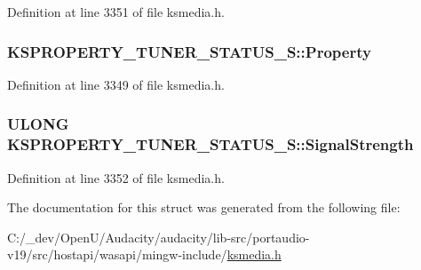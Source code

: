 Definition at line 3351 of file ksmedia.\+h.

\subsubsection[{\texorpdfstring{Property}{Property}}]{ K\+S\+P\+R\+O\+P\+E\+R\+T\+Y\+\_\+\+T\+U\+N\+E\+R\+\_\+\+S\+T\+A\+T\+U\+S\+\_\+\+S\+::\+Property}\hypertarget{struct_k_s_p_r_o_p_e_r_t_y___t_u_n_e_r___s_t_a_t_u_s___s_a1aa106b2f455577d29edec0fc9bc6b14}{}\label{struct_k_s_p_r_o_p_e_r_t_y___t_u_n_e_r___s_t_a_t_u_s___s_a1aa106b2f455577d29edec0fc9bc6b14}


Definition at line 3349 of file ksmedia.\+h.

\subsubsection[{\texorpdfstring{Signal\+Strength}{SignalStrength}}]{\setlength{\rightskip}{0pt plus 5cm}U\+L\+O\+NG K\+S\+P\+R\+O\+P\+E\+R\+T\+Y\+\_\+\+T\+U\+N\+E\+R\+\_\+\+S\+T\+A\+T\+U\+S\+\_\+\+S\+::\+Signal\+Strength}\hypertarget{struct_k_s_p_r_o_p_e_r_t_y___t_u_n_e_r___s_t_a_t_u_s___s_a89fa47e685ce5f69b03e0082328210a9}{}\label{struct_k_s_p_r_o_p_e_r_t_y___t_u_n_e_r___s_t_a_t_u_s___s_a89fa47e685ce5f69b03e0082328210a9}


Definition at line 3352 of file ksmedia.\+h.



The documentation for this struct was generated from the following file\+:\begin{DoxyCompactItemize}
\item 
C\+:/\+\_\+dev/\+Open\+U/\+Audacity/audacity/lib-\/src/portaudio-\/v19/src/hostapi/wasapi/mingw-\/include/\hyperlink{ksmedia_8h}{ksmedia.\+h}\end{DoxyCompactItemize}
